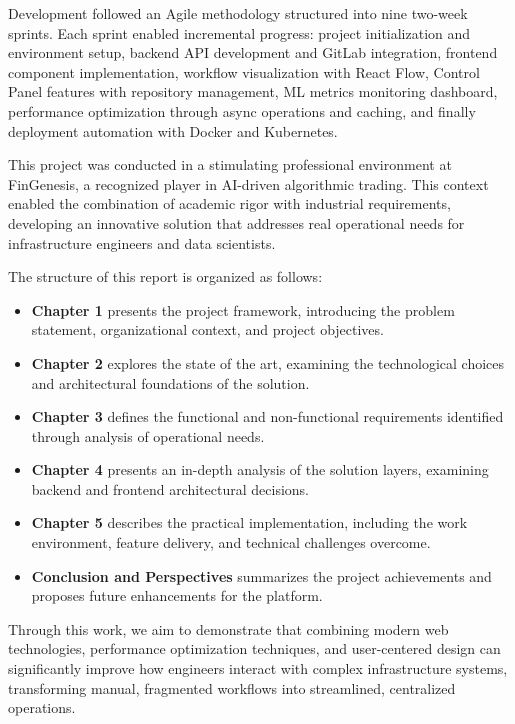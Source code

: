 Development followed an Agile methodology structured into nine two-week sprints. Each sprint enabled incremental progress: project initialization and environment setup, backend API development and GitLab integration, frontend component implementation, workflow visualization with React Flow, Control Panel features with repository management, ML metrics monitoring dashboard, performance optimization through async operations and caching, and finally deployment automation with Docker and Kubernetes.

This project was conducted in a stimulating professional environment at FinGenesis, a recognized player in AI-driven algorithmic trading. This context enabled the combination of academic rigor with industrial requirements, developing an innovative solution that addresses real operational needs for infrastructure engineers and data scientists.

The structure of this report is organized as follows:

\begin{itemize}
    \item \textbf{Chapter 1} presents the project framework, introducing the problem statement, organizational context, and project objectives.
    \item \textbf{Chapter 2} explores the state of the art, examining the technological choices and architectural foundations of the solution.
    \item \textbf{Chapter 3} defines the functional and non-functional requirements identified through analysis of operational needs.
    \item \textbf{Chapter 4} presents an in-depth analysis of the solution layers, examining backend and frontend architectural decisions.
    \item \textbf{Chapter 5} describes the practical implementation, including the work environment, feature delivery, and technical challenges overcome.
    \item \textbf{Conclusion and Perspectives} summarizes the project achievements and proposes future enhancements for the platform.
\end{itemize}

Through this work, we aim to demonstrate that combining modern web technologies, performance optimization techniques, and user-centered design can significantly improve how engineers interact with complex infrastructure systems, transforming manual, fragmented workflows into streamlined, centralized operations.